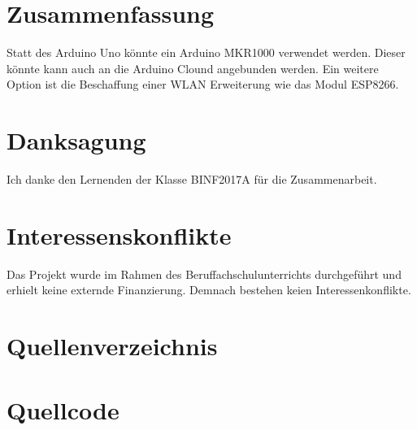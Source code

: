 \section{Zusammenfassung}
Statt des Arduino Uno könnte ein Arduino MKR1000 verwendet werden. Dieser könnte kann auch an die Arduino Clound angebunden werden.
Ein weitere Option ist die Beschaffung einer WLAN Erweiterung wie das Modul ESP8266.

\section{Danksagung}
Ich danke den Lernenden der Klasse BINF2017A für die Zusammenarbeit.

\section{Interessenskonflikte}
Das Projekt wurde im Rahmen des Beruffachschulunterrichts durchgeführt und erhielt
keine externde Finanzierung. Demnach bestehen keien Interessenkonflikte.

\newpage
\section{Quellenverzeichnis}
\printbibliography[heading=subbibliography,title={Bücher},type=book]
\printbibliography[heading=subbibliography,title={Web},type=online]
\printbibliography[heading=subbibliography,title={Manuals},type=manual]
\printbibliography[heading=subbibliography,title={Software},type=misc]

\newpage
\appendix{}
\section{Quellcode}


